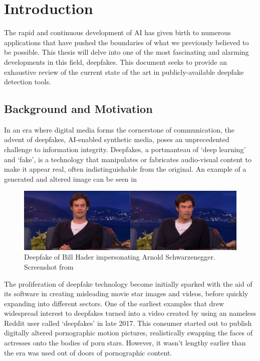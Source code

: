 
\chapter{Introduction}\label{chapter:introduction}
The rapid and continuous development of \ac{AI} has given birth to numerous
applications that have pushed the boundaries of what we previously believed to be possible.
This thesis will delve into one of the most fascinating and alarming developments in this
field, deepfakes. This document seeks to provide an exhaustive review of the current state
of the art in publicly-available deepfake detection tools.



\section{Background and Motivation}\label{chapter:backgroundAndMotivation}
In an era where digital media forms the cornerstone of communication, the advent of deepfakes,
\ac{AI}-enabled synthetic media, poses an unprecedented challenge to information integrity.
Deepfakes, a portmanteau of `deep learning' and `fake', is a technology that manipulates or
fabricates audio-visual content to make it appear real, often indistinguishable from the original.
An example of a generated and altered image can be seen in 

\begin{figure}[hb]
    \centering
    \includegraphics[scale=0.289]{figures/bill-arnold}
    \caption{Deepfake of Bill Hader impersonating Arnold Schwarzenegger. Screenshot from~\cite{bill-hader}}\label{fig:bill-hagel}
\end{figure}

The proliferation of deepfake technology become initially sparked with the aid of 
its software in creating misleading movie star images and videos, before quickly 
expanding into different sectors. One of the earliest examples that drew widespread 
interest to deepfakes turned into a video created by using an nameless Reddit user 
called `deepfakes' in late 2017. This consumer started out to publish digitally 
altered pornographic motion pictures, realistically swapping the faces of 
actresses onto the bodies of porn stars. However, it wasn't lengthy earlier than 
the era was used out of doors of pornographic content.

